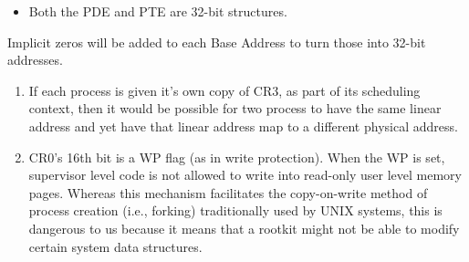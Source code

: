 \begin{note}
\begin{itemize}
\item Both the PDE and PTE are 32-bit structures.
\end{itemize}

Implicit zeros will be added to each Base Address to turn those into 32-bit addresses.
\end{note}

\begin{note}
\begin{enumerate}
\item If each process is given it's own copy of CR3, as part of its scheduling context, then it would be possible for two process to have the same linear address and yet have that linear address map to a different physical address.
\item CR0's 16th bit is a WP flag (as in write protection). When the WP is set, supervisor level code is not allowed to write into read-only user level memory pages. Whereas this mechanism facilitates the copy-on-write method of process creation (i.e., forking) traditionally used by UNIX systems, this is dangerous to us because it means that a rootkit might not be able to modify certain system data structures.
\end{enumerate}


\end{note}